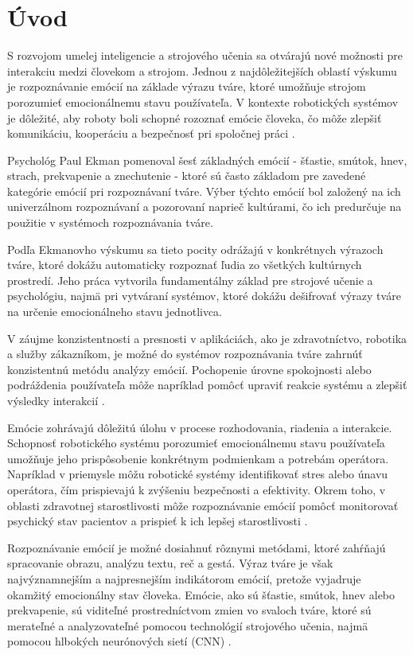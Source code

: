\section{Úvod}
S rozvojom umelej inteligencie a strojového učenia sa otvárajú nové možnosti pre interakciu medzi človekom a strojom. Jednou z najdôležitejších oblastí výskumu je rozpoznávanie emócií na základe výrazu tváre, 
ktoré umožňuje strojom porozumieť emocionálnemu stavu používateľa. V kontexte robotických systémov je dôležité, aby roboty boli schopné rozoznať emócie človeka, čo môže zlepšiť komunikáciu, 
kooperáciu a bezpečnosť pri spoločnej práci \cite{article04}.

Psychológ Paul Ekman pomenoval šesť základných emócií - šťastie, smútok, hnev, strach, prekvapenie a znechutenie - ktoré sú často základom pre zavedené kategórie emócií pri rozpoznávaní tváre. 
Výber týchto emócií bol založený na ich univerzálnom rozpoznávaní a pozorovaní naprieč kultúrami, čo ich predurčuje na použitie v systémoch rozpoznávania tváre.

Podľa Ekmanovho výskumu sa tieto pocity odrážajú v konkrétnych výrazoch tváre, ktoré dokážu automaticky rozpoznať ľudia zo všetkých kultúrnych prostredí. Jeho práca vytvorila fundamentálny základ 
pre strojové učenie a psychológiu, najmä pri vytváraní systémov, ktoré dokážu dešifrovať výrazy tváre na určenie emocionálneho stavu jednotlivca.

V záujme konzistentnosti a presnosti v aplikáciách, ako je zdravotníctvo, robotika a služby zákazníkom, je možné do systémov rozpoznávania tváre zahrnúť konzistentnú metódu analýzy emócií. 
Pochopenie úrovne spokojnosti alebo podráždenia používateľa môže napríklad pomôcť upraviť reakcie systému a zlepšiť výsledky interakcií \cite{article06}.

Emócie zohrávajú dôležitú úlohu v procese rozhodovania, riadenia a interakcie. Schopnosť robotického systému porozumieť emocionálnemu stavu používateľa umožňuje jeho prispôsobenie konkrétnym podmienkam a 
potrebám operátora. Napríklad v priemysle môžu robotické systémy identifikovať stres alebo únavu operátora, čím prispievajú k zvýšeniu bezpečnosti a efektivity​. Okrem toho, v oblasti zdravotnej starostlivosti 
môže rozpoznávanie emócií pomôcť monitorovať psychický stav pacientov a prispieť k ich lepšej starostlivosti​ \cite{article03}. 

Rozpoznávanie emócií je možné dosiahnuť rôznymi metódami, ktoré zahŕňajú spracovanie obrazu, analýzu textu, reč a gestá​. Výraz tváre je však najvýznamnejším a najpresnejším indikátorom emócií, 
pretože vyjadruje okamžitý emocionálny stav človeka. Emócie, ako sú šťastie, smútok, hnev alebo prekvapenie, sú viditeľné prostredníctvom zmien vo svaloch tváre, ktoré sú merateľné a analyzovateľné 
pomocou technológií strojového učenia, najmä pomocou hlbokých neurónových sietí (CNN) \cite{article04}.


